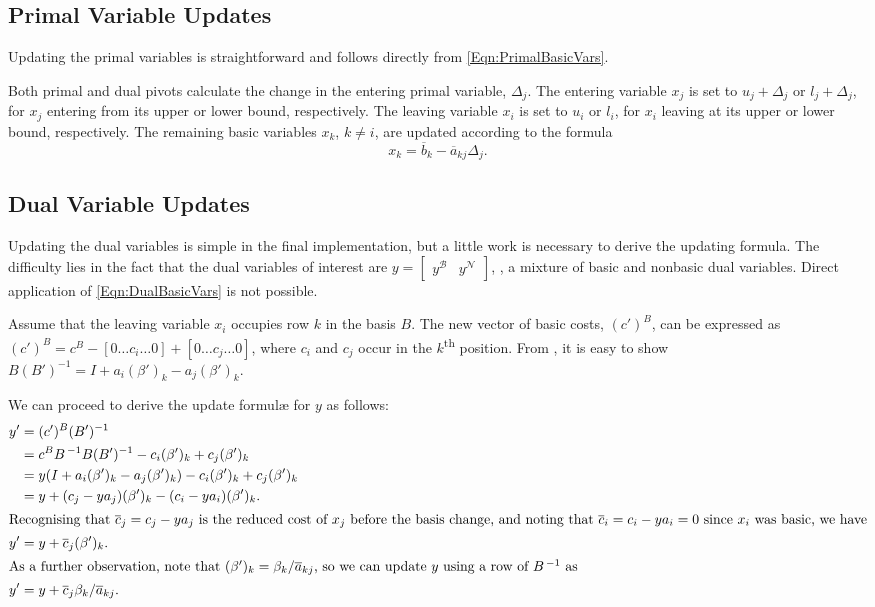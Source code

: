 \subsection{Primal Variable Updates}

Updating the primal variables is straightforward and follows directly from
\eqref{Eqn:PrimalBasicVars}.

Both primal and dual pivots calculate the change in the entering primal
variable, $\Delta_j$.
The entering variable $x_j$ is set to $u_j+\Delta_j$ or
$l_j+\Delta_j$, for $x_j$ entering from its upper or lower bound,
respectively.
The leaving variable $x_i$ is set to $u_i$ or $l_i$, for
$x_i$ leaving at its upper or lower bound, respectively.
The remaining basic variables $x_k$, $k \neq i$, are updated according to
the formula
\begin{equation*}
x_k = \overline{b}_k - \overline{a}_{kj}\Delta_j.
\end{equation*}

\subsection{Dual Variable Updates}
\label{sec:DualUpdates}

Updating the dual variables is simple in the final implementation, but a little
work is necessary to derive the updating formula.
The difficulty lies in the fact that the dual variables of interest are
$y = \begin{bmatrix} y^\mathcal{B} & y^\mathcal{N} \end{bmatrix}$, \ie, a
mixture of basic and nonbasic dual variables.
Direct application of \eqref{Eqn:DualBasicVars} is not possible.

Assume that the leaving variable $x_i$ occupies row $k$ in the basis $B$.
The new vector of basic costs, $(c')^B$, can be expressed as
$(c')^B = c^B - [0 \ldots c_i \ldots 0] + [0 \ldots c_j \ldots 0]$, where
$c_i$ and $c_j$ occur in the $k$\textsuperscript{th} position.
From , it is easy to show
$B(B')^{-1} = I + a_i(\beta')_k - a_j(\beta')_k$.

We can proceed to derive the update formul\ae{} for $y$ as follows:
\begin{align*}
y' & = (c')^B (B')^{-1} \\
   & = c^B B^{\,-1} B (B')^{-1} - c_i(\beta')_k + c_j(\beta')_k \\
   & = y(I + a_i(\beta')_k - a_j(\beta')_k) -
       c_i(\beta')_k + c_j(\beta')_k \\
   & = y + (c_j - y a_j)(\beta')_k - (c_i - y a_i)(\beta')_k . \\
%
\intertext{Recognising that $\overline{c}_j = c_j - y a_j$ is the reduced
cost of $x_j$ before the basis change, and noting that
$\overline{c}_i = c_i - y a_i = 0$ since $x_i$ was basic, we have}
%
y' & = y + \overline{c}_j(\beta')_k . \\
%
\intertext{As a further observation, note that
$(\beta')_k = \beta_k/\overline{a}_{kj}$, so we can update $y$ using
a row of $B^{\,-1}$ as}
%
y' & = y + \overline{c}_j\beta_k/\overline{a}_{kj}.
\end{align*}

